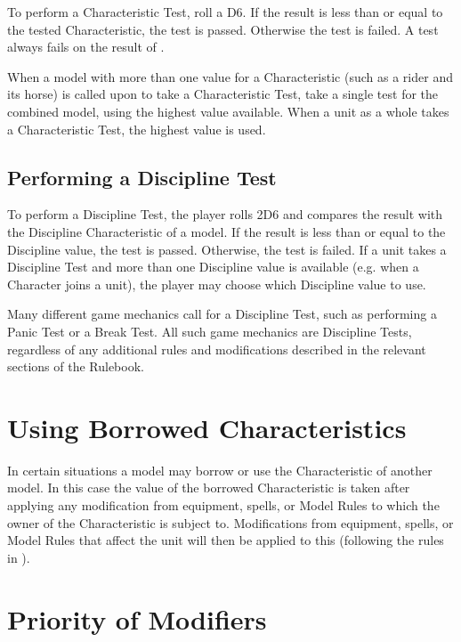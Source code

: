 To perform a Characteristic Test, roll a D6. If the result is less than or equal to the tested Characteristic, the test is passed. Otherwise the test is failed. A test always fails on the result of .

When a model with more than one value for a Characteristic (such as a rider and its horse) is called upon to take a Characteristic Test, take a single test for the combined model, using the highest value available. When a unit as a whole takes a Characteristic Test, the highest value is used.

\subsection{Performing a Discipline Test}
\label{performing_a_discipline_test}

To perform a Discipline Test, the player rolls 2D6 and compares the result with the Discipline Characteristic of a model. If the result is less than or equal to the Discipline value, the test is passed. Otherwise, the test is failed. If a unit takes a Discipline Test and more than one Discipline value is available (e.g. when a Character joins a unit), the player may choose which Discipline value to use.

Many different game mechanics call for a Discipline Test, such as performing a Panic Test or a Break Test. All such game mechanics are Discipline Tests, regardless of any additional rules and modifications described in the relevant sections of the Rulebook.

\section{Using Borrowed Characteristics}
\label{using_borrowed_characteristics}

In certain situations a model may borrow or use the Characteristic of another model. In this case the value of the borrowed Characteristic is taken after applying any modification from equipment, spells, or Model Rules to which the owner of the Characteristic is subject to. Modifications from equipment, spells, or Model Rules that affect the unit will then be applied to this (following the rules in ).

\section{Priority of Modifiers}
\label{priority_of_modifiers}

